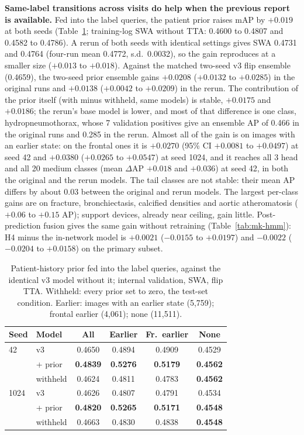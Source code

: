 \documentclass[conference]{IEEEtran}
\begin{document}
\textbf{Same-label transitions across visits do help when the previous report is available.} Fed into the label queries, the patient prior raises mAP by $+0.019$ at both seeds (Table~\ref{tab:mk-innet}; training-log SWA without TTA: 0.4600 to 0.4807 and 0.4582 to 0.4786). A rerun of both seeds with identical settings gives SWA 0.4731 and 0.4764 (four-run mean 0.4772, s.d.\ 0.0032), so the gain reproduces at a smaller size ($+0.013$ to $+0.018$). Against the matched two-seed v3 flip ensemble (0.4659), the two-seed prior ensemble gains $+0.0208$ ($+0.0132$ to $+0.0285$) in the original runs and $+0.0138$ ($+0.0042$ to $+0.0209$) in the rerun. The contribution of the prior itself (with minus withheld, same models) is stable, $+0.0175$ and $+0.0186$; the rerun's base model is lower, and most of that difference is one class, hydropneumothorax, whose 7 validation positives give an ensemble AP of 0.466 in the original runs and 0.285 in the rerun. Almost all of the gain is on images with an earlier state: on the frontal ones it is $+0.0270$ (95\% CI $+0.0081$ to $+0.0497$) at seed 42 and $+0.0380$ ($+0.0265$ to $+0.0547$) at seed 1024, and it reaches all 3 head and all 20 medium classes (mean $\Delta$AP $+0.018$ and $+0.036$) at seed 42, in both the original and the rerun models. The tail classes are not stable: their mean AP differs by about $0.03$ between the original and rerun models. The largest per-class gains are on fracture, bronchiectasis, calcified densities and aortic atheromatosis ($+0.06$ to $+0.15$ AP); support devices, already near ceiling, gain little. Post-prediction fusion gives the same gain without retraining (Table~\ref{tab:mk-hmm}): H4 minus the in-network model is $+0.0021$ ($-0.0155$ to $+0.0197$) and $-0.0022$ ($-0.0204$ to $+0.0158$) on the primary subset.

\begin{table}[htbp]
\caption{Patient-history prior fed into the label queries, against the identical v3 model without it; internal validation, SWA, flip TTA. Withheld: every prior set to zero, the test-set condition. Earlier: images with an earlier state (5,759); frontal earlier (4,061); none (11,511).}
\begin{center}
\footnotesize
\setlength{\tabcolsep}{4pt}
\begin{tabular}{|l|l|c|c|c|c|}
\hline
\textbf{Seed} & \textbf{Model} & \textbf{All} & \textbf{Earlier} & \textbf{Fr.\ earlier} & \textbf{None} \\
\hline
42 & v3 & 0.4650 & 0.4894 & 0.4909 & 0.4529 \\
 & + prior & \textbf{0.4839} & \textbf{0.5276} & \textbf{0.5179} & \textbf{0.4562} \\
 & withheld & 0.4624 & 0.4811 & 0.4783 & \textbf{0.4562} \\
\hline
1024 & v3 & 0.4626 & 0.4807 & 0.4791 & 0.4534 \\
 & + prior & \textbf{0.4820} & \textbf{0.5265} & \textbf{0.5171} & \textbf{0.4548} \\
 & withheld & 0.4663 & 0.4830 & 0.4838 & \textbf{0.4548} \\
\hline
\end{tabular}
\label{tab:mk-innet}
\end{center}
\end{table}
\end{document}
